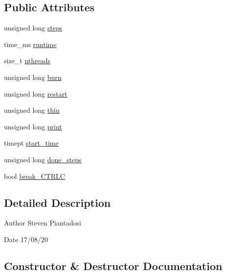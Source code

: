 \subsection*{Public Attributes}
\begin{DoxyCompactItemize}
\item 
unsigned long \hyperlink{struct_control_af4bd5a6c779079b5e921b4df40760266}{steps}
\item 
time\+\_\+ms \hyperlink{struct_control_ae14b7e8a0d59a10d5fb7d000707ed4b9}{runtime}
\item 
size\+\_\+t \hyperlink{struct_control_a7c7748be70415c187e9cfd8124ab711b}{nthreads}
\item 
unsigned long \hyperlink{struct_control_acb1e669784385d64b9f840674a3e08c1}{burn}
\item 
unsigned long \hyperlink{struct_control_acd75b8aa48fdb33f063bae7469a9721b}{restart}
\item 
unsigned long \hyperlink{struct_control_a08030350e86fd21411599690892e31a8}{thin}
\item 
unsigned long \hyperlink{struct_control_a508fb30a9e74771b84bb846bcd6f2f2a}{print}
\item 
timept \hyperlink{struct_control_ad3c2691a66705880844f467cf5da8aab}{start\+\_\+time}
\item 
unsigned long \hyperlink{struct_control_a4a1867401c3e89aecaf14949521ed247}{done\+\_\+steps}
\item 
bool \hyperlink{struct_control_a3a1856c582efd2a6a1b8f40351038d0c}{break\+\_\+\+C\+T\+R\+LC}
\end{DoxyCompactItemize}


\subsection{Detailed Description}
\begin{DoxyAuthor}{Author}
Steven Piantadosi 
\end{DoxyAuthor}
\begin{DoxyDate}{Date}
17/08/20 
\end{DoxyDate}


\subsection{Constructor \& Destructor Documentation}
\mbox{\label{struct_control_a1403ae58ef8c681793bd3d94b3f3e704}} 
